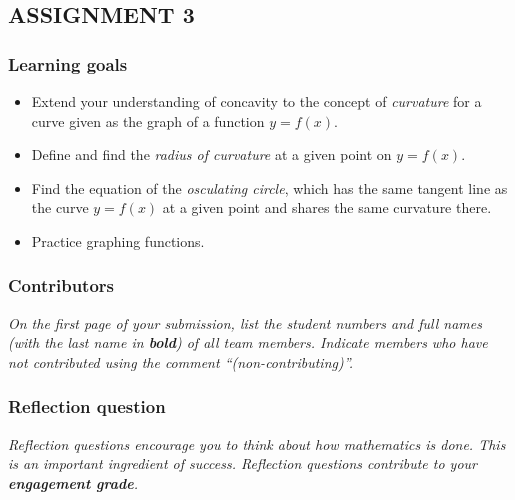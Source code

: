 \documentclass{exam}
\begin{document}
\subsection*{ASSIGNMENT 3}

\subsubsection*{Learning goals}
\begin{itemize}
    \setlength\itemsep{0.1em}
    \item Extend your understanding of concavity to the concept of \textit{curvature}  for a curve given as the graph of a function $y=f(x)$. 
    \item Define and find the \textit{radius of curvature} at a given point on $y=f(x)$.
    \item Find the equation of the \textit{osculating circle}, which has the same tangent line as the curve $y=f(x)$ at a given point and shares the same curvature there. 
    \item Practice graphing functions.
\end{itemize}
\hrulefill

\subsubsection*{Contributors}

\textit{On the first page of your submission, list the student numbers and full names (with the last name in \textbf{bold}) of all team members. Indicate members who have not contributed using the comment ``(non-contributing)''.}

\noindent\hrulefill

\subsubsection*{Reflection question}

\textit{Reflection questions encourage you to think about how mathematics is done. This is an important ingredient of success. Reflection questions contribute to your \textbf{engagement grade}.}
\end{document}
